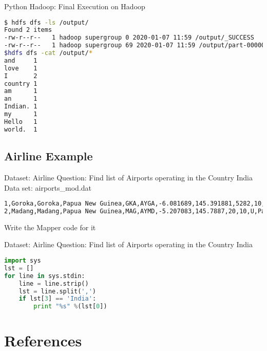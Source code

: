 \documentclass[pdf]{beamer}
\begin{document}
\begin{frame}[fragile]{Python Hadoop: Final Execution on Hadoop}
\begin{lstlisting}[language=bash]
$ hdfs dfs -ls /output/
Found 2 items
-rw-r--r--   1 hadoop supergroup 0 2020-01-07 11:59 /output/_SUCCESS
-rw-r--r--   1 hadoop supergroup 69 2020-01-07 11:59 /output/part-00000
$hdfs dfs -cat /output/*
and     1
love    1
I       2
country 1
am      1
an      1
Indian. 1
my      1
Hello   1
world.  1
\end{lstlisting}
\end{frame}


\subsection{Airline Example}
\begin{frame}[fragile]{Dataset: Airline}
Question: Find list of Airports operating in the Country India
\\
Data set: airports\_mod.dat

\begin{lstlisting}[language=bash]
1,Goroka,Goroka,Papua New Guinea,GKA,AYGA,-6.081689,145.391881,5282,10,U,Pacific/Port_Moresby
2,Madang,Madang,Papua New Guinea,MAG,AYMD,-5.207083,145.7887,20,10,U,Pacific/Port_Moresby
\end{lstlisting}
Write the Mapper code for it
\end{frame}

\begin{frame}[fragile]{Dataset: Airline}
Question: Find list of Airports operating in the Country India
\begin{lstlisting}[language=python]
import sys
lst = []
for line in sys.stdin:
    line = line.strip()
    lst = line.split(',')
    if lst[3] == 'India':
        print "%s" %(lst[0]) 
\end{lstlisting}
\end{frame}


\section{References}
 

\end{document}
